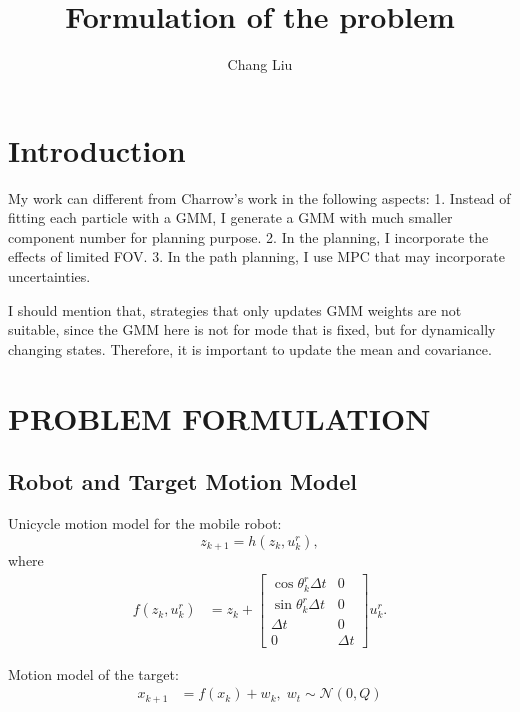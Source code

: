 \documentclass[letterpaper, 10 pt, conference]{ieeeconf}  %
\title{\LARGE \bf
Formulation of the problem}
\author{Chang Liu}%
\newcommand{\todopara}[1]{\vspace{0px} %
	\todo[inline, color=black!10]{\textbf{[Paragraph:]} {#1}} %
}
\newcommand{\todonote}[1]{\vspace{0px} %
	\todo[inline, color=green!30]{\textbf{[Note:]} {#1}} %
}
\newcommand{\todoQ}[1]{\vspace{0px} %
	\todo[inline, color=orange!50]{\textbf{[Note:]} {#1}} %
}
\newcommand{\todohere}[1]{\hl{(\textbf{TODO:} #1)}}
\newcommand{\hidetodos}{
	\renewcommand{\todopara}[1]{}
	\renewcommand{\todonote}[1]{}
	\renewcommand{\todoQ}[1]{}
	\renewcommand{\todohere}[1]{}
	}
\begin{document}

\maketitle
\thispagestyle{empty}
\pagestyle{empty}

\section{Introduction}
My work can different from Charrow's work in the following aspects:
1. Instead of fitting each particle with a GMM, I generate a GMM with much smaller component number for planning purpose.
2. In the planning, I incorporate the effects of limited FOV.
3. In the path planning, I use MPC that may incorporate uncertainties.

I should mention that, strategies that only updates GMM weights are not suitable, since the GMM here is not for mode that is fixed, but for dynamically changing states. Therefore, it is important to update the mean and covariance.
\section{PROBLEM FORMULATION}\label{sec:prob_form}

\subsection{Robot and Target Motion Model}
Unicycle motion model for the mobile robot:
\begin{equation}\label{eqn:target_motion_model}
z_{k+1}=h(z_k,u^r_k),
\end{equation}
where
	\begin{align}
		f(z_k,u^r_k)&=z_{k}+
		\begin{bmatrix}
			\cos{\theta^r_{k}}\Delta t & 0\\
			\sin{\theta^r_{k}}\Delta t & 0\\
			\Delta t & 0\\
			0 & \Delta t
		\end{bmatrix}u^r_{k}\nonumber.
	\end{align}

Motion model of the target:
\begin{align}
x_{k+1}&=f(x_k)+w_k,\;w_t\sim \mathcal{N}(0,Q)\\
\end{align}
\end{document}
